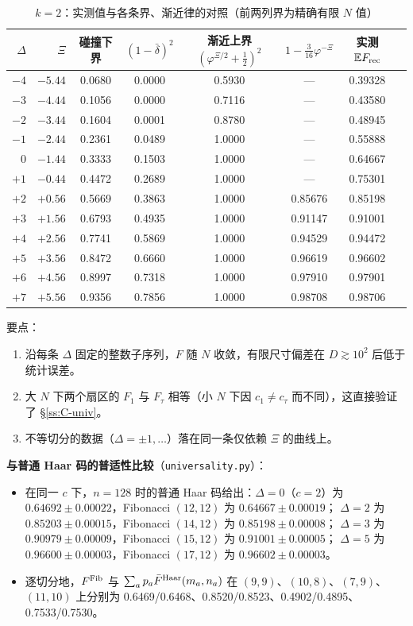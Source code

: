 \documentclass[11pt,a4paper,UTF8]{ctexart}
\newcommand{\E}{\mathbb{E}}
\newcommand{\Frec}{F_{\rm rec}}
\newcommand{\code}[1]{\texttt{#1}}
\begin{document}
\begin{table}[htbp]
\centering\small
\caption{$k=2$：实测值与各条界、渐近律的对照（前两列界为精确有限 $N$ 值）}\label{tab:k2b}
\begin{tabular}{rrcccccc}
\toprule
$\Delta$ & $\Xi$ & 碰撞下界 & $(1-\bar\delta)^2$ & 渐近上界 $(\varphi^{\Xi/2}+\frac12)^2$ & $1-\frac3{16}\varphi^{-\Xi}$ & 实测 $\E\Frec$\\
\midrule
$-4$ & $-5.44$ & 0.0680 & 0.0000 & 0.5930 & --- & 0.39328\\
$-3$ & $-4.44$ & 0.1056 & 0.0000 & 0.7116 & --- & 0.43580\\
$-2$ & $-3.44$ & 0.1604 & 0.0001 & 0.8780 & --- & 0.48945\\
$-1$ & $-2.44$ & 0.2361 & 0.0489 & 1.0000 & --- & 0.55888\\
$0$  & $-1.44$ & 0.3333 & 0.1503 & 1.0000 & --- & 0.64667\\
$+1$ & $-0.44$ & 0.4472 & 0.2689 & 1.0000 & --- & 0.75301\\
$+2$ & $+0.56$ & 0.5669 & 0.3863 & 1.0000 & 0.85676 & 0.85198\\
$+3$ & $+1.56$ & 0.6793 & 0.4935 & 1.0000 & 0.91147 & 0.91001\\
$+4$ & $+2.56$ & 0.7741 & 0.5869 & 1.0000 & 0.94529 & 0.94472\\
$+5$ & $+3.56$ & 0.8472 & 0.6660 & 1.0000 & 0.96619 & 0.96602\\
$+6$ & $+4.56$ & 0.8997 & 0.7318 & 1.0000 & 0.97910 & 0.97901\\
$+7$ & $+5.56$ & 0.9356 & 0.7856 & 1.0000 & 0.98708 & 0.98706\\
\bottomrule
\end{tabular}
\end{table}

\noindent 要点：
\begin{enumerate}
  \item 沿每条 $\Delta$ 固定的整数子序列，$F$ 随 $N$ 收敛，有限尺寸偏差在 $D\gtrsim10^2$ 后低于统计误差。
  \item 大 $N$ 下两个扇区的 $F_1$ 与 $F_\tau$ 相等（小 $N$ 下因 $c_1\ne c_\tau$ 而不同），这直接验证了 \S\ref{ss:C-univ}。
  \item 不等切分的数据（$\Delta=\pm1,\dots$）落在同一条仅依赖 $\Xi$ 的曲线上。
\end{enumerate}

\noindent\textbf{与普通 Haar 码的普适性比较}（\code{universality.py}）：
\begin{itemize}
  \item 在同一 $c$ 下，$n=128$ 时的普通 Haar 码给出：$\Delta=0$（$c=2$）为 $0.64692\pm0.00022$，Fibonacci $(12,12)$ 为 $0.64667\pm0.00019$；
  $\Delta=2$ 为 $0.85203\pm0.00015$，Fibonacci $(14,12)$ 为 $0.85198\pm0.00008$；
  $\Delta=3$ 为 $0.90979\pm0.00009$，Fibonacci $(15,12)$ 为 $0.91001\pm0.00005$；
  $\Delta=5$ 为 $0.96600\pm0.00003$，Fibonacci $(17,12)$ 为 $0.96602\pm0.00003$。
  \item 逐切分地，$F^{\rm Fib}$ 与 $\sum_ap_a\bar F^{\rm Haar}(m_a,n_a)$ 在 $(9,9)$、$(10,8)$、$(7,9)$、$(11,10)$ 上分别为
  0.6469/0.6468、0.8520/0.8523、0.4902/0.4895、0.7533/0.7530。
\end{itemize}
\end{document}
